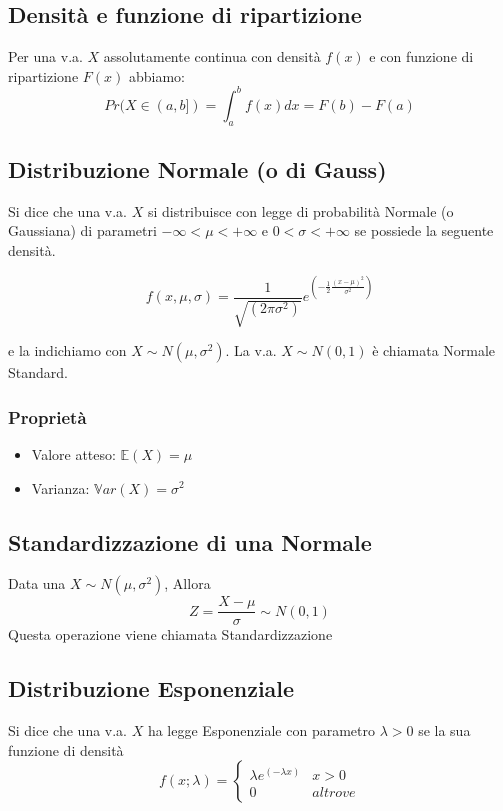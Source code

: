 \documentclass[a4paper]{report}
\begin{document}
  \subsection{Densità e funzione di ripartizione}
  Per una v.a. $X$ assolutamente continua con densità $f(x)$ e con funzione di ripartizione $F(x)$ abbiamo:
  \[ Pr(X \in (a,b]) = \int_{a}^{b} f(x) dx = F(b) - F(a) \]

  \subsection{Distribuzione Normale (o di Gauss)}
  Si dice che una v.a. $X$ si distribuisce con legge di probabilità Normale (o Gaussiana) di parametri $-\infty < \mu < +\infty$ e $ 0 < \sigma < +\infty$ se possiede la seguente densità.

  \[ f(x,\mu,\sigma) = \frac{1}{\sqrt{(2 \pi \sigma^2)}} e^{( -\frac{1}{2} \frac{(x-\mu)^2}{\sigma^2})} \]

  e la indichiamo con $X \sim N(\mu, \sigma^2)$. La v.a. $X \sim N(0,1)$ è chiamata Normale Standard.

  \subsubsection{Proprietà}
  \begin{itemize}
    \item Valore atteso: $\mathbb{E}(X) = \mu$
    \item Varianza: $\mathbb{V}ar(X) = \sigma^2$
  \end{itemize}

  \subsection{Standardizzazione di una Normale}
  Data una $X \sim N(\mu,\sigma^2)$, Allora
  \[ Z = \frac{X-\mu}{\sigma} \sim N(0,1) \]
  Questa operazione viene chiamata Standardizzazione


  \subsection{Distribuzione Esponenziale}
  Si dice che una v.a. $X$ ha legge Esponenziale con parametro $\lambda >0$ se la sua funzione di densità
  \[
    f(x;\lambda) =
    \begin{cases}
      \lambda e^{(-\lambda x)} & x > 0 \\
      0 & altrove
    \end{cases}
  \]
\end{document}
